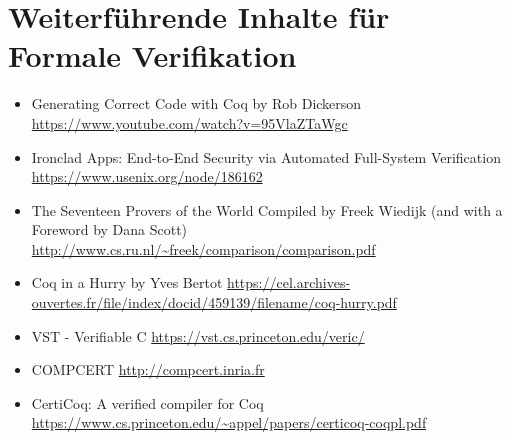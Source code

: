 \section{Weiterführende Inhalte für Formale Verifikation}
\label{a:somelabel}

\begin{itemize}
	\item Generating Correct Code with Coq by Rob Dickerson \url{https://www.youtube.com/watch?v=95VlaZTaWgc}
	\item Ironclad Apps: End-to-End Security via Automated Full-System Verification \url{https://www.usenix.org/node/186162}
	\item The Seventeen Provers of the World Compiled by Freek Wiedijk
	(and with a Foreword by Dana Scott)
	\url{http://www.cs.ru.nl/~freek/comparison/comparison.pdf}
	\item Coq in a Hurry by Yves Bertot \url{https://cel.archives-ouvertes.fr/file/index/docid/459139/filename/coq-hurry.pdf}
	\item VST - Verifiable C \url{https://vst.cs.princeton.edu/veric/}
	\item COMPCERT \url{http://compcert.inria.fr}
	\item CertiCoq: A verified compiler for Coq
	 \url{https://www.cs.princeton.edu/~appel/papers/certicoq-coqpl.pdf}
\end{itemize} 

